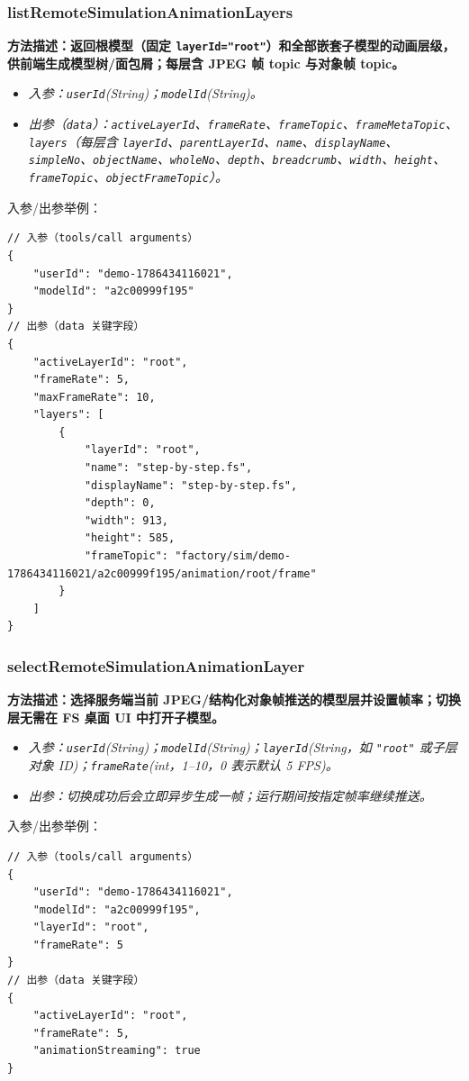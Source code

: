 \subsubsection{listRemoteSimulationAnimationLayers}
\bf{方法描述}：返回根模型（固定 \texttt{layerId="root"}）和全部嵌套子模型的动画层级，供前端生成模型树/面包屑；每层含 JPEG 帧 topic 与对象帧 topic。
\begin{itemize}
	\item \it{入参}：\texttt{userId}(String)；\texttt{modelId}(String)。
	\item \it{出参}（\texttt{data}）：\texttt{activeLayerId}、\texttt{frameRate}、\texttt{frameTopic}、\texttt{frameMetaTopic}、\texttt{layers}（每层含 \texttt{layerId}、\texttt{parentLayerId}、\texttt{name}、\texttt{displayName}、\texttt{simpleNo}、\texttt{objectName}、\texttt{wholeNo}、\texttt{depth}、\texttt{breadcrumb}、\texttt{width}、\texttt{height}、\texttt{frameTopic}、\texttt{objectFrameTopic}）。
\end{itemize}
入参/出参举例：
\begin{lstlisting}
// 入参（tools/call arguments）
{
    "userId": "demo-1786434116021",
    "modelId": "a2c00999f195"
}
// 出参（data 关键字段）
{
    "activeLayerId": "root",
    "frameRate": 5,
    "maxFrameRate": 10,
    "layers": [
        {
            "layerId": "root",
            "name": "step-by-step.fs",
            "displayName": "step-by-step.fs",
            "depth": 0,
            "width": 913,
            "height": 585,
            "frameTopic": "factory/sim/demo-1786434116021/a2c00999f195/animation/root/frame"
        }
    ]
}
\end{lstlisting}\vspace{-30pt}

\subsubsection{selectRemoteSimulationAnimationLayer}
\bf{方法描述}：选择服务端当前 JPEG/结构化对象帧推送的模型层并设置帧率；切换层无需在 FS 桌面 UI 中打开子模型。
\begin{itemize}
	\item \it{入参}：\texttt{userId}(String)；\texttt{modelId}(String)；\texttt{layerId}(String，如 \texttt{"root"} 或子层对象 ID)；\texttt{frameRate}(int，1--10，0 表示默认 5 FPS)。
	\item \it{出参}：切换成功后会立即异步生成一帧；运行期间按指定帧率继续推送。
\end{itemize}
入参/出参举例：
\begin{lstlisting}
// 入参（tools/call arguments）
{
    "userId": "demo-1786434116021",
    "modelId": "a2c00999f195",
    "layerId": "root",
    "frameRate": 5
}
// 出参（data 关键字段）
{
    "activeLayerId": "root",
    "frameRate": 5,
    "animationStreaming": true
}
\end{lstlisting}\vspace{-30pt}


